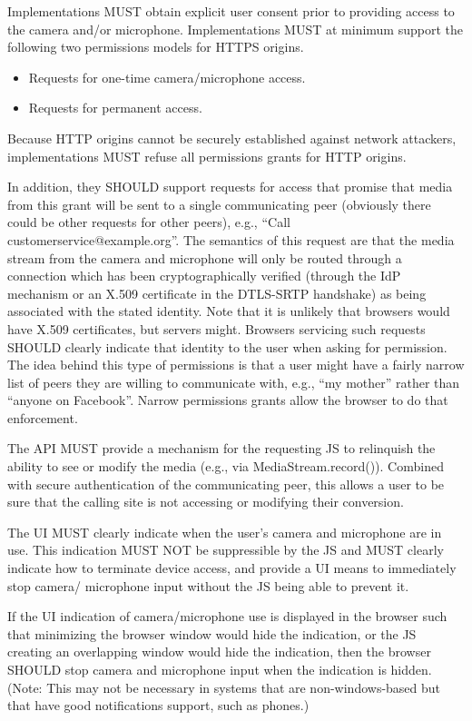 \documentclass{article}
\begin{document}
Implementations MUST obtain explicit user consent prior to providing
access to the camera and/or microphone.  Implementations MUST at
minimum support the following two permissions models for HTTPS
origins.

\begin{itemize}
\item Requests for one-time camera/microphone access.

\item Requests for permanent access.
\end{itemize}

Because HTTP origins cannot be securely established against network
attackers, implementations MUST refuse all permissions grants for
HTTP origins.

In addition, they SHOULD support requests for access that promise
that media from this grant will be sent to a single communicating
peer (obviously there could be other requests for other peers), e.g.,
``Call customerservice@example.org''.  The semantics of this request
are that the media stream from the camera and microphone will only be
routed through a connection which has been cryptographically verified
(through the IdP mechanism or an X.509 certificate in the DTLS-SRTP
handshake) as being associated with the stated identity.  Note that
it is unlikely that browsers would have X.509 certificates, but
servers might.  Browsers servicing such requests SHOULD clearly
indicate that identity to the user when asking for permission.  The
idea behind this type of permissions is that a user might have a
fairly narrow list of peers they are willing to communicate with,
e.g., ``my mother'' rather than ``anyone on Facebook''.  Narrow
permissions grants allow the browser to do that enforcement.

\begin{description}[style=nextline]
\item[API Requirement:] The API MUST provide a mechanism for the requesting
  JS to relinquish the ability to see or modify the media (e.g., via
  MediaStream.record()).  Combined with secure authentication of the
  communicating peer, this allows a user to be sure that the calling
  site is not accessing or modifying their conversion.

\item[UI Requirement:] The UI MUST clearly indicate when the user's camera
  and microphone are in use.  This indication MUST NOT be
  suppressible by the JS and MUST clearly indicate how to terminate
  device access, and provide a UI means to immediately stop camera/
  microphone input without the JS being able to prevent it.

\item[UI Requirement:] If the UI indication of camera/microphone use is
  displayed in the browser such that minimizing the browser window
  would hide the indication, or the JS creating an overlapping
  window would hide the indication, then the browser SHOULD stop
  camera and microphone input when the indication is hidden.  (Note:
  This may not be necessary in systems that are non-windows-based
  but that have good notifications support, such as phones.)
\end{description}
\end{document}
